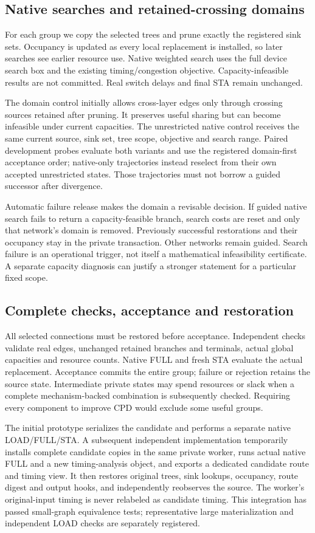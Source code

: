 \documentclass[conference,10pt]{IEEEtran}
\begin{document}
\subsection{Native searches and retained-crossing domains}
For each group we copy the selected trees and prune exactly the registered sink sets. Occupancy is updated as every local replacement is installed, so later searches see earlier resource use. Native weighted search uses the full device search box and the existing timing/congestion objective. Capacity-infeasible results are not committed. Real switch delays and final STA remain unchanged.

The domain control initially allows cross-layer edges only through crossing sources retained after pruning. It preserves useful sharing but can become infeasible under current capacities. The unrestricted native control receives the same current source, sink set, tree scope, objective and search range. Paired development probes evaluate both variants and use the registered domain-first acceptance order; native-only trajectories instead reselect from their own accepted unrestricted states. Those trajectories must not borrow a guided successor after divergence.

Automatic failure release makes the domain a revisable decision. If guided native search fails to return a capacity-feasible branch, search costs are reset and only that network's domain is removed. Previously successful restorations and their occupancy stay in the private transaction. Other networks remain guided. Search failure is an operational trigger, not itself a mathematical infeasibility certificate. A separate capacity diagnosis can justify a stronger statement for a particular fixed scope.

\subsection{Complete checks, acceptance and restoration}
All selected connections must be restored before acceptance. Independent checks validate real edges, unchanged retained branches and terminals, actual global capacities and resource counts. Native FULL and fresh STA evaluate the actual replacement. Acceptance commits the entire group; failure or rejection retains the source state. Intermediate private states may spend resources or slack when a complete mechanism-backed combination is subsequently checked. Requiring every component to improve CPD would exclude some useful groups.

The initial prototype serializes the candidate and performs a separate native LOAD/FULL/STA. A subsequent independent implementation temporarily installs complete candidate copies in the same private worker, runs actual native FULL and a new timing-analysis object, and exports a dedicated candidate route and timing view. It then restores original trees, sink lookups, occupancy, route digest and output hooks, and independently reobserves the source. The worker's original-input timing is never relabeled as candidate timing. This integration has passed small-graph equivalence tests; representative large materialization and independent LOAD checks are separately registered.
\end{document}
